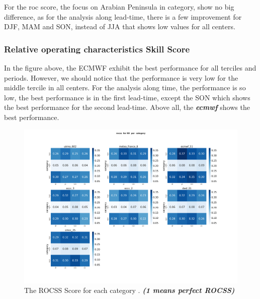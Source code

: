 For the roc score, the focus on Arabian Peninsula in category, show no big difference, as for the analysis along lead-time, there is a few improvement for DJF, MAM and SON, instead of JJA that shows low values for all centers. 																																																					
\subsubsection{Relative operating characteristics Skill Score}

In the figure above, the ECMWF exhibit the best performance for all terciles and periods. However, we should notice that the performance is very low for the middle tercile in all centers. For the analysis along time, the performance is so low, the best performance is in the first lead-time, except the SON which shows the best performance for the second lead-time. Above all, the \textbf{\textit{ecmwf}} shows the best performance.

\begin{figure}[H]
    \centering
    \includegraphics[scale=0.25]{plots/prob/rocss/rocss_RR_category.png}
    \caption{The ROCSS Score for each category  . \textbf{\textit{(1 means perfect ROCSS)}}}
\end{figure}


